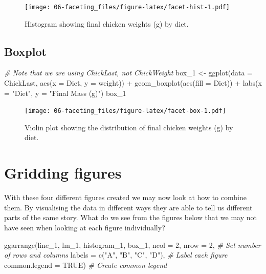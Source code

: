 \documentclass[
]{book}
\newenvironment{Shaded}{\begin{snugshade}}{\end{snugshade}}
\newcommand{\AttributeTok}[1]{\textcolor[rgb]{0.77,0.63,0.00}{#1}}
\newcommand{\CommentTok}[1]{\textcolor[rgb]{0.56,0.35,0.01}{\textit{#1}}}
\newcommand{\ConstantTok}[1]{\textcolor[rgb]{0.00,0.00,0.00}{#1}}
\newcommand{\DecValTok}[1]{\textcolor[rgb]{0.00,0.00,0.81}{#1}}
\newcommand{\FunctionTok}[1]{\textcolor[rgb]{0.00,0.00,0.00}{#1}}
\newcommand{\NormalTok}[1]{#1}
\newcommand{\OtherTok}[1]{\textcolor[rgb]{0.56,0.35,0.01}{#1}}
\newcommand{\SpecialCharTok}[1]{\textcolor[rgb]{0.00,0.00,0.00}{#1}}
\newcommand{\StringTok}[1]{\textcolor[rgb]{0.31,0.60,0.02}{#1}}
\begin{document}
\begin{figure}
\centering
\texttt{[image: 06-faceting\_files/figure-latex/facet-hist-1.pdf]}
\caption{\label{fig:facet-hist}Histogram showing final chicken weights (g) by diet.}
\end{figure}

\hypertarget{boxplot}{%
\subsection{Boxplot}\label{boxplot}}

\begin{Shaded}
\begin{Highlighting}[]
\CommentTok{\# Note that we are using \textquotesingle{}ChickLast\textquotesingle{}, not \textquotesingle{}ChickWeight\textquotesingle{}}
\NormalTok{box\_1 }\OtherTok{\textless{}{-}} \FunctionTok{ggplot}\NormalTok{(}\AttributeTok{data =}\NormalTok{ ChickLast, }\FunctionTok{aes}\NormalTok{(}\AttributeTok{x =}\NormalTok{ Diet, }\AttributeTok{y =}\NormalTok{ weight)) }\SpecialCharTok{+}
  \FunctionTok{geom\_boxplot}\NormalTok{(}\FunctionTok{aes}\NormalTok{(}\AttributeTok{fill =}\NormalTok{ Diet)) }\SpecialCharTok{+}
  \FunctionTok{labs}\NormalTok{(}\AttributeTok{x =} \StringTok{"Diet"}\NormalTok{, }\AttributeTok{y =} \StringTok{"Final Mass (g)"}\NormalTok{)}
\NormalTok{box\_1}
\end{Highlighting}
\end{Shaded}

\begin{figure}
\centering
\texttt{[image: 06-faceting\_files/figure-latex/facet-box-1.pdf]}
\caption{\label{fig:facet-box}Violin plot showing the distribution of final chicken weights (g) by diet.}
\end{figure}

\hypertarget{gridding-figures}{%
\section{Gridding figures}\label{gridding-figures}}

With these four different figures created we may now look at how to combine them. By visualising the data in different ways they are able to tell us different parts of the same story. What do we see from the figures below that we may not have seen when looking at each figure individually?

\begin{Shaded}
\begin{Highlighting}[]
\FunctionTok{ggarrange}\NormalTok{(line\_1, lm\_1, histogram\_1, box\_1, }
          \AttributeTok{ncol =} \DecValTok{2}\NormalTok{, }\AttributeTok{nrow =} \DecValTok{2}\NormalTok{, }\CommentTok{\# Set number of rows and columns}
          \AttributeTok{labels =} \FunctionTok{c}\NormalTok{(}\StringTok{"A"}\NormalTok{, }\StringTok{"B"}\NormalTok{, }\StringTok{"C"}\NormalTok{, }\StringTok{"D"}\NormalTok{), }\CommentTok{\# Label each figure}
          \AttributeTok{common.legend =} \ConstantTok{TRUE}\NormalTok{) }\CommentTok{\# Create common legend}
\end{Highlighting}
\end{Shaded}
\end{document}
